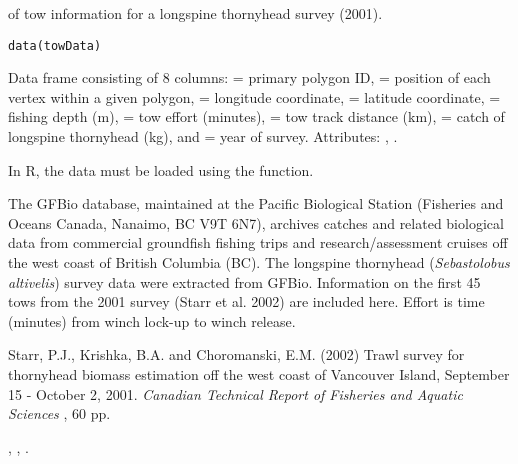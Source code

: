 \documentclass[letterpaper]{book}
\begin{document}
%
\begin{Description}\relax
{} of tow information for a longspine thornyhead survey (2001).
\end{Description}
%
\begin{Usage}
\begin{verbatim}
data(towData)
\end{verbatim}
\end{Usage}
%
\begin{Format}
Data frame consisting of 8 columns:  = primary polygon ID,
 = position of each vertex within a given polygon, 
= longitude coordinate,  = latitude coordinate, 
= fishing depth (m),  = tow effort (minutes), 
= tow track distance (km),  = catch of longspine
thornyhead (kg), and  = year of survey. Attributes:
, .
\end{Format}
%
\begin{Note}\relax
In R, the data must be loaded using the  function.
\end{Note}
%
\begin{Source}\relax
The GFBio database, maintained at the Pacific Biological Station
(Fisheries and Oceans Canada, Nanaimo, BC V9T 6N7), archives catches
and related biological data from commercial groundfish fishing trips
and research/assessment cruises off the west coast of British Columbia
(BC).  The longspine thornyhead (\emph{Sebastolobus altivelis}) survey data
were extracted from GFBio. Information on the first 45 tows from the
2001 survey (Starr et al. 2002) are included here. Effort is time
(minutes) from winch lock-up to winch release.
\end{Source}
%
\begin{References}\relax
Starr, P.J., Krishka, B.A. and Choromanski, E.M. (2002) Trawl survey
for thornyhead biomass estimation off the west coast of Vancouver
Island, September 15 - October 2, 2001. \emph{Canadian Technical Report of
Fisheries and Aquatic Sciences} , 60 pp.
\end{References}
%
\begin{SeeAlso}\relax
{},
,
.
\end{SeeAlso}
\end{document}
